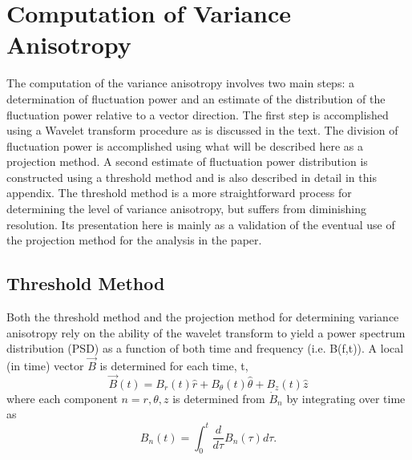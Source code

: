 \documentclass[aip,prl,amsmath,amssymb,reprint,superscriptaddress]{revtex4-1} %
\begin{document}
\appendix

\section{Computation of Variance Anisotropy}\label{sec:projection}

The computation of the variance anisotropy involves two main steps: a determination of fluctuation power and an estimate of the distribution of the fluctuation power relative to a vector direction. The first step is accomplished using a Wavelet transform procedure as is discussed in the text. The division of fluctuation power is accomplished using what will be described here as a projection method. A second estimate of fluctuation power distribution is constructed using a threshold method and is also described in detail in this appendix. The threshold method is a more straightforward process for determining the level of variance anisotropy, but suffers from diminishing resolution. Its presentation here is mainly as a validation of the eventual use of the projection method for the analysis in the paper. 

\subsection{Threshold Method}

Both the threshold method and the projection method for determining variance anisotropy rely on the ability of the wavelet transform to yield a power spectrum distribution (PSD) as a function of both time and frequency (i.e. B(f,t)). A local (in time) vector $\vec{B}$ is determined for each time, t,
\begin{equation}
\vec{B}(t) = B_{r}(t)\hat{r} + B_{\theta}(t)\hat{\theta} + B_{z}(t)\hat{z}
\label{eq:Bvector}
\end{equation}
where each component $n=r,\theta,z$ is determined from $\dot{B}_{n}$ by integrating over time as
\begin{equation}
B_{n}(t) = \int_{0}^{t} \frac{d}{d\tau}B_{n}(\tau)d\tau.
\label{eq:Bintegrated}
\end{equation}
\end{document}
